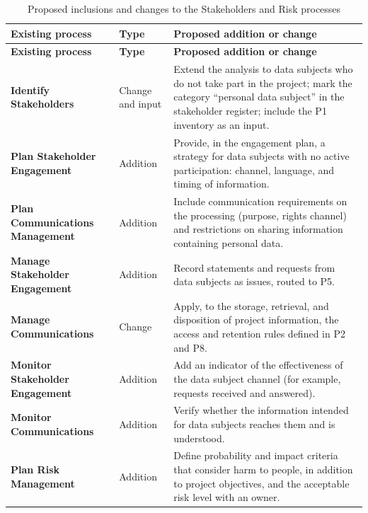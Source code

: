\documentclass[12pt,a4paper,article,oneside,brazil,english]{abntex2}
\begin{document}
\begingroup\SingleSpacing\small
\begin{longtable}{@{}>{\raggedright\arraybackslash}p{}>{\raggedright\arraybackslash}p{}>{\raggedright\arraybackslash}p{}@{}}
\caption{Proposed inclusions and changes to the Stakeholders and Risk processes}\label{tab:t10}\\
\hline
\textbf{Existing process} & \textbf{Type} & \textbf{Proposed addition or change}\\
\hline
\endfirsthead
\hline
\textbf{Existing process} & \textbf{Type} & \textbf{Proposed addition or change}\\
\hline
\endhead
\hline
\endfoot
\hline
\endlastfoot
\textbf{Identify Stakeholders} & Change and input & Extend the analysis to data subjects who do not take part in the project; mark the category \textquotedblleft{}personal data subject\textquotedblright{} in the stakeholder register; include the P1 inventory as an input.\\[3pt]
\textbf{Plan Stakeholder Engagement} & Addition & Provide, in the engagement plan, a strategy for data subjects with no active participation: channel, language, and timing of information.\\[3pt]
\textbf{Plan Communications Management} & Addition & Include communication requirements on the processing (purpose, rights channel) and restrictions on sharing information containing personal data.\\[3pt]
\textbf{Manage Stakeholder Engagement} & Addition & Record statements and requests from data subjects as issues, routed to P5.\\[3pt]
\textbf{Manage Communications} & Change & Apply, to the storage, retrieval, and disposition of project information, the access and retention rules defined in P2 and P8.\\[3pt]
\textbf{Monitor Stakeholder Engagement} & Addition & Add an indicator of the effectiveness of the data subject channel (for example, requests received and answered).\\[3pt]
\textbf{Monitor Communications} & Addition & Verify whether the information intended for data subjects reaches them and is understood.\\[3pt]
\textbf{Plan Risk Management} & Addition & Define probability and impact criteria that consider harm to people, in addition to project objectives, and the acceptable risk level with an owner.\\[3pt]

\end{longtable}
\end{document}
